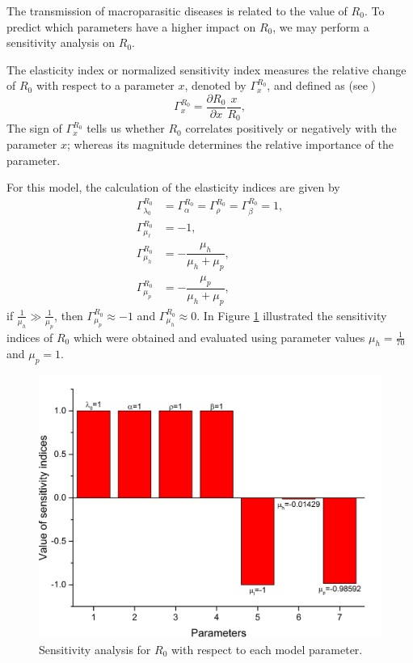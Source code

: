 \documentclass[eng]{MMSB-class-eng}
\begin{document}
	{\color{red}	
		The transmission of macroparasitic diseases is related to the value of $R_0$. To predict which parameters have a higher impact on $R_0$, we may perform a sensitivity analysis on $R_0$.	
	
	The elasticity index or normalized sensitivity index measures the relative change of $R_0$ with respect to a parameter $x$, denoted by $\Gamma^{R_0}_{x}$, and defined as (see \citet{van2017reproduction})
	\begin{equation}
	\Gamma^{R_0}_{x}=\dfrac{\partial R_0}{\partial x} \dfrac{x}{R_0},
	\end{equation}
	The sign of $\Gamma^{R_0}_{x}$ tells us whether $R_0$ correlates positively or negatively  with the  parameter $x$; whereas its magnitude determines the relative importance of the parameter.
	
	For this model, the calculation of the elasticity indices are given by	
	\begin{equation}
	\begin{split}
	\Gamma^{R_0}_{\lambda_0}&=\Gamma^{R_0}_{\alpha}=\Gamma^{R_0}_{\rho}=\Gamma^{R_0}_{\beta}=1,\\ 
	\Gamma^{R_0}_{\mu_{\ell}}&=-1,\\
	\Gamma^{R_0}_{\mu_h}&=-\dfrac{\mu_h}{\mu_{h}+\mu_p},\\
	\Gamma^{R_0}_{\mu_p}&=-\dfrac{\mu_p}{\mu_{h}+\mu_p},
	\end{split}
	\end{equation}
	if $\frac{1}{\mu_h} \gg \frac{1}{\mu_p}$, then $\Gamma^{R_0}_{\mu_p}\approx -1$
	and 
	$\Gamma^{R_0}_{\mu_h}\approx 0$.
	In Figure \ref{fig:sensitivity} illustrated the sensitivity indices of $R_0$ which were obtained and evaluated using parameter values 
	$\mu_h=\frac{1}{70}$ and $\mu_p=1$.
	\begin{figure}[h!]
		\centering
		\includegraphics[width=0.9\linewidth]{sensitivity}
		\caption{Sensitivity analysis for $R_0$ with respect to each model parameter.}
		\label{fig:sensitivity}
	\end{figure}
	
}
\end{document}
